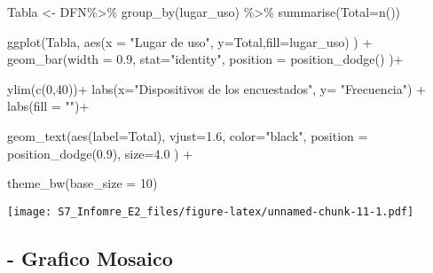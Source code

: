 \documentclass[
]{article}
\newenvironment{Shaded}{\begin{snugshade}}{\end{snugshade}}
\newcommand{\AttributeTok}[1]{\textcolor[rgb]{0.77,0.63,0.00}{#1}}
\newcommand{\DecValTok}[1]{\textcolor[rgb]{0.00,0.00,0.81}{#1}}
\newcommand{\FloatTok}[1]{\textcolor[rgb]{0.00,0.00,0.81}{#1}}
\newcommand{\FunctionTok}[1]{\textcolor[rgb]{0.00,0.00,0.00}{#1}}
\newcommand{\NormalTok}[1]{#1}
\newcommand{\OtherTok}[1]{\textcolor[rgb]{0.56,0.35,0.01}{#1}}
\newcommand{\SpecialCharTok}[1]{\textcolor[rgb]{0.00,0.00,0.00}{#1}}
\newcommand{\StringTok}[1]{\textcolor[rgb]{0.31,0.60,0.02}{#1}}
\begin{document}
\begin{Shaded}
\begin{Highlighting}[]
\NormalTok{Tabla }\OtherTok{\textless{}{-}}\NormalTok{ DFN}\SpecialCharTok{\%\textgreater{}\%} \FunctionTok{group\_by}\NormalTok{(lugar\_uso) }\SpecialCharTok{\%\textgreater{}\%} \FunctionTok{summarise}\NormalTok{(}\AttributeTok{Total=}\FunctionTok{n}\NormalTok{())   }
    
\FunctionTok{ggplot}\NormalTok{(Tabla, }\FunctionTok{aes}\NormalTok{(}\AttributeTok{x =} \StringTok{"Lugar de uso"}\NormalTok{, }\AttributeTok{y=}\NormalTok{Total,}\AttributeTok{fill=}\NormalTok{lugar\_uso) ) }\SpecialCharTok{+}    
  \FunctionTok{geom\_bar}\NormalTok{(}\AttributeTok{width =} \FloatTok{0.9}\NormalTok{, }\AttributeTok{stat=}\StringTok{"identity"}\NormalTok{,              }
           \AttributeTok{position =} \FunctionTok{position\_dodge}\NormalTok{()                 )}\SpecialCharTok{+}  
  
  \FunctionTok{ylim}\NormalTok{(}\FunctionTok{c}\NormalTok{(}\DecValTok{0}\NormalTok{,}\DecValTok{40}\NormalTok{))}\SpecialCharTok{+}
  \FunctionTok{labs}\NormalTok{(}\AttributeTok{x=}\StringTok{"Dispositivos de los encuestados"}\NormalTok{, }\AttributeTok{y=} \StringTok{"Frecuencia"}\NormalTok{) }\SpecialCharTok{+}   
  \FunctionTok{labs}\NormalTok{(}\AttributeTok{fill =} \StringTok{""}\NormalTok{)}\SpecialCharTok{+}                                         
  
  \FunctionTok{geom\_text}\NormalTok{(}\FunctionTok{aes}\NormalTok{(}\AttributeTok{label=}\NormalTok{Total), }\AttributeTok{vjust=}\FloatTok{1.6}\NormalTok{, }\AttributeTok{color=}\StringTok{"black"}\NormalTok{,    }
              \AttributeTok{position =} \FunctionTok{position\_dodge}\NormalTok{(}\FloatTok{0.9}\NormalTok{),  }\AttributeTok{size=}\FloatTok{4.0}
\NormalTok{            ) }\SpecialCharTok{+}                                            
  
  \FunctionTok{theme\_bw}\NormalTok{(}\AttributeTok{base\_size =} \DecValTok{10}\NormalTok{)}
\end{Highlighting}
\end{Shaded}

\texttt{[image: S7\_Infomre\_E2\_files/figure-latex/unnamed-chunk-11-1.pdf]}

\hypertarget{grafico-mosaico}{%
\subsection{- Grafico Mosaico}\label{grafico-mosaico}}
\end{document}
